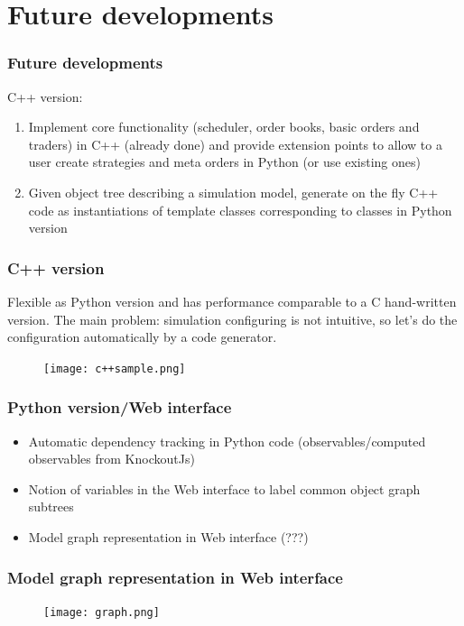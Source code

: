 \documentclass{beamer}
\begin{document}
\section{Future developments}
\begin{frame}
\frametitle{Future developments}
C++ version:
\begin{enumerate}
  \item Implement core functionality (scheduler, order books, basic orders and traders) in C++ (already done) and provide extension points to allow to a user create strategies and meta orders in Python (or use existing ones)
  \item Given object tree describing a simulation model, generate on the fly C++ code as instantiations of template classes corresponding to classes in Python version
\end{enumerate}
\end{frame}

\begin{frame}
\frametitle{C++ version}
Flexible as Python version and has performance comparable to a C hand-written version. The main problem: simulation configuring is not intuitive, so let's do the configuration automatically by a code generator.
\begin{figure}[htbp]
\centering
\texttt{[image: c++sample.png]}
\end{figure}
\end{frame}

\begin{frame}
\frametitle{Python version/Web interface}
\begin{itemize}
  \item Automatic dependency tracking in Python code (observables/computed observables from KnockoutJs)
  \item Notion of variables in the Web interface to label common object graph subtrees
  \item Model graph representation in Web interface (???)
\end{itemize}
\end{frame}

\begin{frame}
\frametitle{Model graph representation in Web interface}
\begin{figure}[htbp]
\centering
\texttt{[image: graph.png]}
\end{figure}
\end{frame}
\end{document}
